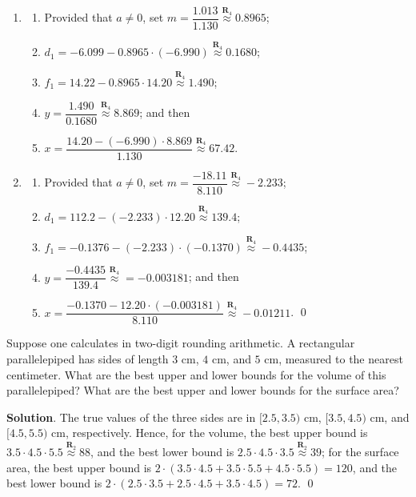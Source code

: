 \documentclass[11pt]{article}
\theoremstyle{break}
\numberwithin{equation}{theorem}
\begin{document}
\begin{enumerate}
    \item \begin{enumerate}[label=\arabic*.]
        \item Provided that $a\ne 0$, set $m=\dfrac{1.013}{1.130}\overset{\textbf{R}_4}{\approx}0.8965$;
        \item $d_1=-6.099-0.8965\cdot(-6.990)\overset{\textbf{R}_4}{\approx}0.1680$;
        \item $f_1=14.22-0.8965\cdot14.20\overset{\textbf{R}_4}{\approx}1.490$;
        \item $y=\dfrac{1.490}{0.1680}\overset{\textbf{R}_4}{\approx}8.869$; and then
        \item $x=\dfrac{14.20-(-6.990)\cdot8.869}{1.130}\overset{\textbf{R}_4}{\approx}67.42$.
    \end{enumerate}
    \item \begin{enumerate}[label=\arabic*.]
        \item Provided that $a\ne 0$, set $m=\dfrac{-18.11}{8.110}\overset{\textbf{R}_4}{\approx}-2.233$;
        \item $d_1=112.2-(-2.233)\cdot12.20\overset{\textbf{R}_4}{\approx}139.4$;
        \item $f_1=-0.1376-(-2.233)\cdot(-0.1370)\overset{\textbf{R}_4}{\approx}-0.4435$;
        \item $y=\dfrac{-0.4435}{139.4}\overset{\textbf{R}_4}{\approx}=-0.003181$; and then
        \item $x=\dfrac{-0.1370-12.20\cdot(-0.003181)}{8.110}\overset{\textbf{R}_4}{\approx}-0.01211$. \qed
    \end{enumerate}
\end{enumerate}

\newpage
\begin{problem}\label{problem 9}
    Suppose one calculates in two-digit rounding arithmetic. A rectangular parallelepiped has sides of length $3$ cm, $4$ cm, and $5$ cm, measured to the nearest centimeter. What are the best upper and lower bounds for the volume of this parallelepiped? What are the best upper and lower bounds for the surface area?
\end{problem}
\textbf{Solution}. The true values of the three sides are in $[2.5, 3.5)$ cm, $[3.5, 4.5)$ cm, and $[4.5, 5.5)$ cm, respectively. Hence, for the volume, the best upper bound is $3.5\cdot4.5\cdot5.5\overset{\textbf{R}_2}{\approx}88$, and the best lower bound is $2.5\cdot4.5\cdot3.5\overset{\textbf{R}_2}{\approx}39$; for the surface area, the best upper bound is $2\cdot(3.5\cdot4.5+3.5\cdot5.5+4.5\cdot5.5)=120$, and the best lower bound is $2\cdot(2.5\cdot3.5+2.5\cdot4.5+3.5\cdot4.5)=72$. \qed
\end{document}
